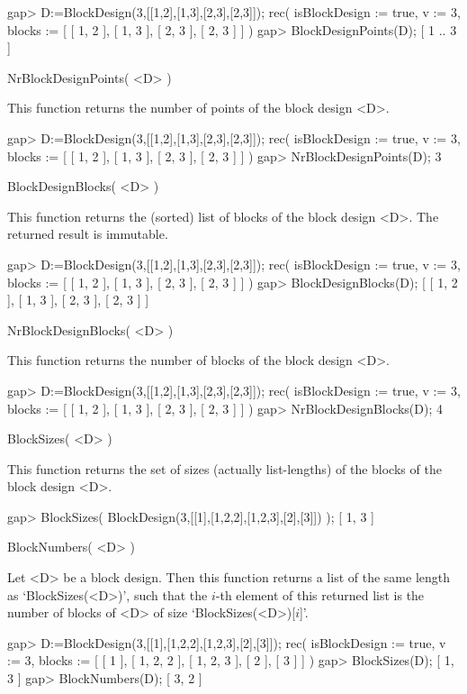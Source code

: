 \beginexample
gap> D:=BlockDesign(3,[[1,2],[1,3],[2,3],[2,3]]);
rec( isBlockDesign := true, v := 3, 
  blocks := [ [ 1, 2 ], [ 1, 3 ], [ 2, 3 ], [ 2, 3 ] ] )
gap> BlockDesignPoints(D);                       
[ 1 .. 3 ]
\endexample



\>NrBlockDesignPoints( <D> )

This function returns the number of points of the block design <D>.

\beginexample
gap> D:=BlockDesign(3,[[1,2],[1,3],[2,3],[2,3]]);
rec( isBlockDesign := true, v := 3, 
  blocks := [ [ 1, 2 ], [ 1, 3 ], [ 2, 3 ], [ 2, 3 ] ] )
gap> NrBlockDesignPoints(D);                     
3
\endexample



\>BlockDesignBlocks( <D> )

This function returns the (sorted) list of blocks of the block design <D>.
The returned result is immutable.

\beginexample
gap> D:=BlockDesign(3,[[1,2],[1,3],[2,3],[2,3]]);
rec( isBlockDesign := true, v := 3, 
  blocks := [ [ 1, 2 ], [ 1, 3 ], [ 2, 3 ], [ 2, 3 ] ] )
gap> BlockDesignBlocks(D);                       
[ [ 1, 2 ], [ 1, 3 ], [ 2, 3 ], [ 2, 3 ] ]
\endexample



\>NrBlockDesignBlocks( <D> )

This function returns the number of blocks of the block design <D>.

\beginexample
gap> D:=BlockDesign(3,[[1,2],[1,3],[2,3],[2,3]]);
rec( isBlockDesign := true, v := 3, 
  blocks := [ [ 1, 2 ], [ 1, 3 ], [ 2, 3 ], [ 2, 3 ] ] )
gap> NrBlockDesignBlocks(D);                     
4
\endexample



\>BlockSizes( <D> )

This function returns the set of sizes (actually list-lengths) of the 
blocks of the block design <D>.

\beginexample
gap> BlockSizes( BlockDesign(3,[[1],[1,2,2],[1,2,3],[2],[3]]) );  
[ 1, 3 ]
\endexample



\>BlockNumbers( <D> )

Let <D> be a block design. Then this function returns a list of
the same length as `BlockSizes(<D>)', such that the $i$-th element 
of this returned list is the number of blocks of <D> of size
`BlockSizes(<D>)[$i$]'.

\beginexample
gap> D:=BlockDesign(3,[[1],[1,2,2],[1,2,3],[2],[3]]); 
rec( isBlockDesign := true, v := 3, 
  blocks := [ [ 1 ], [ 1, 2, 2 ], [ 1, 2, 3 ], [ 2 ], [ 3 ] ] )
gap> BlockSizes(D);
[ 1, 3 ]
gap> BlockNumbers(D);
[ 3, 2 ]
\endexample



